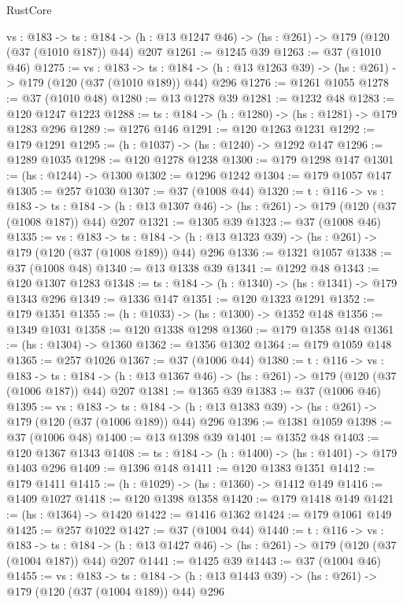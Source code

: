 \begin{lexlean}{RustCore}
\begin{coremodule}
  {vs : @183} ->
  {ts : @184} -> (h : @13 @1247 @46) -> (hs : @261) -> @179 (@120 (@37 (@1010 @187)) @44) @207
@1261 := @1245 @39
@1263 := @37 (@1010 @46)
@1275 := {vs : @183} ->
  {ts : @184} -> (h : @13 @1263 @39) -> (hs : @261) -> @179 (@120 (@37 (@1010 @189)) @44) @296
@1276 := @1261 @1055
@1278 := @37 (@1010 @48)
@1280 := @13 @1278 @39
@1281 := @1232 @48
@1283 := @120 @1247 @1223
@1288 := {ts : @184} -> (h : @1280) -> (hs : @1281) -> @179 @1283 @296
@1289 := @1276 @146
@1291 := @120 @1263 @1231
@1292 := @179 @1291
@1295 := (h : @1037) -> (hs : @1240) -> @1292 @147
@1296 := @1289 @1035
@1298 := @120 @1278 @1238
@1300 := @179 @1298 @147
@1301 := (hs : @1244) -> @1300
@1302 := @1296 @1242
@1304 := @179 @1057 @147
@1305 := @257 @1030
@1307 := @37 (@1008 @44)
@1320 := {t : @116} ->
  {vs : @183} ->
  {ts : @184} -> (h : @13 @1307 @46) -> (hs : @261) -> @179 (@120 (@37 (@1008 @187)) @44) @207
@1321 := @1305 @39
@1323 := @37 (@1008 @46)
@1335 := {vs : @183} ->
  {ts : @184} -> (h : @13 @1323 @39) -> (hs : @261) -> @179 (@120 (@37 (@1008 @189)) @44) @296
@1336 := @1321 @1057
@1338 := @37 (@1008 @48)
@1340 := @13 @1338 @39
@1341 := @1292 @48
@1343 := @120 @1307 @1283
@1348 := {ts : @184} -> (h : @1340) -> (hs : @1341) -> @179 @1343 @296
@1349 := @1336 @147
@1351 := @120 @1323 @1291
@1352 := @179 @1351
@1355 := (h : @1033) -> (hs : @1300) -> @1352 @148
@1356 := @1349 @1031
@1358 := @120 @1338 @1298
@1360 := @179 @1358 @148
@1361 := (hs : @1304) -> @1360
@1362 := @1356 @1302
@1364 := @179 @1059 @148
@1365 := @257 @1026
@1367 := @37 (@1006 @44)
@1380 := {t : @116} ->
  {vs : @183} ->
  {ts : @184} -> (h : @13 @1367 @46) -> (hs : @261) -> @179 (@120 (@37 (@1006 @187)) @44) @207
@1381 := @1365 @39
@1383 := @37 (@1006 @46)
@1395 := {vs : @183} ->
  {ts : @184} -> (h : @13 @1383 @39) -> (hs : @261) -> @179 (@120 (@37 (@1006 @189)) @44) @296
@1396 := @1381 @1059
@1398 := @37 (@1006 @48)
@1400 := @13 @1398 @39
@1401 := @1352 @48
@1403 := @120 @1367 @1343
@1408 := {ts : @184} -> (h : @1400) -> (hs : @1401) -> @179 @1403 @296
@1409 := @1396 @148
@1411 := @120 @1383 @1351
@1412 := @179 @1411
@1415 := (h : @1029) -> (hs : @1360) -> @1412 @149
@1416 := @1409 @1027
@1418 := @120 @1398 @1358
@1420 := @179 @1418 @149
@1421 := (hs : @1364) -> @1420
@1422 := @1416 @1362
@1424 := @179 @1061 @149
@1425 := @257 @1022
@1427 := @37 (@1004 @44)
@1440 := {t : @116} ->
  {vs : @183} ->
  {ts : @184} -> (h : @13 @1427 @46) -> (hs : @261) -> @179 (@120 (@37 (@1004 @187)) @44) @207
@1441 := @1425 @39
@1443 := @37 (@1004 @46)
@1455 := {vs : @183} ->
  {ts : @184} -> (h : @13 @1443 @39) -> (hs : @261) -> @179 (@120 (@37 (@1004 @189)) @44) @296

\end{coremodule}
\end{lexlean}
